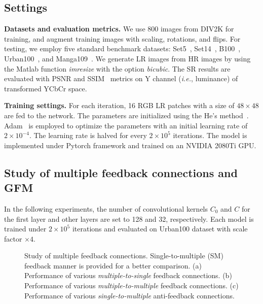 \documentclass{bmvc2k}
\begin{document}
	\subsection{Settings}
	
	\setlength{\parskip}{0.5\baselineskip}
	
	\noindent \textbf{Datasets and evaluation metrics.} We use 800 images from DIV2K for training, and augment training images with scaling, rotations, and flips. For testing, we employ five standard benchmark datasets: Set5~\cite{bevilacqua2012low}, Set14~\cite{zeyde2010single}, B100~\cite{martin2001database}, Urban100~\cite{huang2015single}, and Manga109~\cite{matsui2017sketch}. We generate LR images from HR images by using the Matlab function \textit{imresize} with the option \textit{bicubic}. The SR results are evaluated with PSNR and SSIM~\cite{wang2004image} metrics on Y channel (\textit{i.e.}, luminance) of transformed YCbCr space.
	
	\noindent \textbf{Training settings.} For each iteration, 16 RGB LR patches with a size of $48 \times 48$ are fed to the network. The parameters are initialized using the He's method~\cite{he2015delving}. Adam~\cite{kingma2014adam} is employed to optimize the parameters with an initial learning rate of $2\times10^{-4}$. The learning rate is halved for every $2\times10^{5}$ iterations. The model is implemented under Pytorch framework and trained on an NVIDIA 2080Ti GPU.
	
	\subsection{Study of multiple feedback connections and GFM}
	\label{sec:sgmc}
	
	In the following experiments, the number of convolutional kernels $C_{0}$ and $C$ for the first layer and other layers are set to 128 and 32, respectively. Each model is trained under $2\times10^{5}$ iterations and evaluated on Urban100 dataset with scale factor $\times 4$. 
	
	\begin{figure}
		\centering
		\caption{Study of multiple feedback connections. Single-to-multiple (SM) feedback manner is provided for a better comparison. (a) Performance of various \textit{multiple-to-single} feedback connections. (b) Performance of various \textit{multiple-to-multiple} feedback connections. (c) Performance of various \textit{single-to-multiple} anti-feedback connections. }
		\label{fig:sgmfc}
		\vspace{-6mm}
	\end{figure}
	
\end{document}
